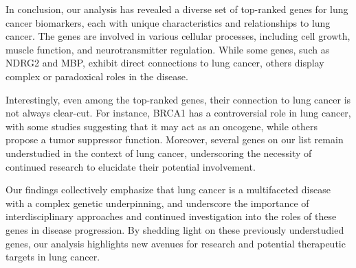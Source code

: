 In conclusion, our analysis has revealed a diverse set of top-ranked genes for lung cancer biomarkers,
each with unique characteristics and relationships to lung cancer.
The genes are involved in various cellular processes, including cell growth, muscle function, and neurotransmitter regulation.
While some genes, such as NDRG2 and MBP, exhibit direct connections to lung cancer,
others display complex or paradoxical roles in the disease.

Interestingly, even among the top-ranked genes, their connection to lung cancer is not always clear-cut.
For instance, BRCA1 has a controversial role in lung cancer, with some studies suggesting that it may act as an oncogene,
while others propose a tumor suppressor function.
Moreover, several genes on our list remain understudied in the context of lung cancer,
underscoring the necessity of continued research to elucidate their potential involvement.

Our findings collectively emphasize that lung cancer is a multifaceted disease with a complex genetic underpinning,
and underscore the importance of interdisciplinary approaches and continued investigation into the roles of these genes in disease progression.
By shedding light on these previously understudied genes, our analysis highlights new avenues for research and potential therapeutic targets in lung cancer.
